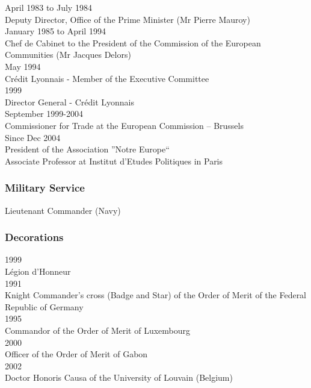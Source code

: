 April 1983 to July 1984\\
Deputy Director, Office of the Prime Minister (Mr Pierre Mauroy)\\

January 1985 to April 1994\\
Chef de Cabinet to the President of the Commission of the European Communities (Mr Jacques Delors)\\

May 1994\\
Crédit Lyonnais - Member of the Executive Committee\\

1999\\
Director General - Crédit Lyonnais\\ 

September 1999-2004\\
Commissioner for Trade at the European Commission -- Brussels\\  

Since Dec 2004\\
President of the Association ''Notre Europe`` \\
Associate Professor at Institut d’Etudes Politiques in Paris\\
      
\subsubsection{Military Service}

Lieutenant Commander (Navy)

  
\subsubsection{Decorations}

1999\\
Légion d'Honneur\\

1991\\
 Knight Commander's cross (Badge and Star) of the Order of Merit of the Federal Republic of Germany\\
      
1995\\
Commandor of the Order of Merit of Luxembourg\\
      
2000\\
 Officer of the Order of Merit of Gabon\\
      
2002\\
Doctor Honoris Causa of the University of Louvain (Belgium)\\
      
